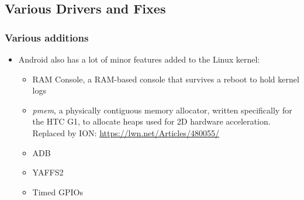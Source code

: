 \subsection{Various Drivers and Fixes}
\begin{frame}
  \frametitle{Various additions}
  \begin{itemize}
  \item Android also has a lot of minor features added to the Linux
    kernel:
    \begin{itemize}
    \item RAM Console, a RAM-based console that survives a reboot to
      hold kernel logs
    \item \textit{pmem}, a physically contiguous memory allocator, written
      specifically for the HTC G1, to allocate heaps used for 2D
	  hardware acceleration. Replaced by ION:
	  \url{https://lwn.net/Articles/480055/}
    \item ADB
    \item YAFFS2
    \item Timed GPIOs
    \end{itemize}
  \end{itemize}
\end{frame}
